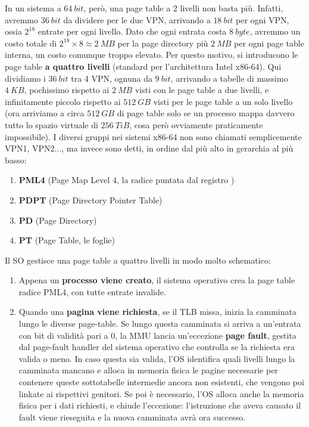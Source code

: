 \documentclass[11pt, a4paper, titlepage, oneside]{scrbook}
\begin{document}
In un sistema a $\SI{64}{bit}$, però, una page table a 2 livelli non basta più. Infatti, avremmo $\SI{36}{bit}$ da dividere per le due VPN, arrivando a $\SI{18}{bit}$ per ogni VPN, ossia $2^{18}$ entrate per ogni livello. Dato che ogni entrata costa $\SI{8}{byte}$, avremmo un costo totale di $2^{18} \times 8 \approx \SI{2}{MB}$ per la page directory più $\SI{2}{MB}$ per ogni page table interna, un costo comunque troppo elevato. Per questo motivo, si introducono le page table \textbf{a quattro livelli} (standard per l'architettura Intel x86-64). Qui dividiamo i $\SI{36}{bit}$ tra 4 VPN, ognuna da $\SI{9}{bit}$, arrivando a tabelle di massimo $\SI{4}{KB}$, pochissimo rispetto ai $\SI{2}{MB}$ visti con le page table a due livelli, e infinitamente piccolo rispetto ai $\SI{512}{GB}$ visti per le page table a un solo livello (ora arriviamo a circa $\SI{512}{GB}$ di page table solo se un processo mappa davvero tutto lo spazio virtuale di $\SI{256}{TiB}$, cosa però ovviamente praticamente impossibile). I diversi gruppi nei sistemi x86-64 non sono chiamati semplicemente VPN1, VPN2..., ma invece sono detti, in ordine dal più alto in gerarchia al più basso:
\begin{enumerate}[label=\arabic*°]
    \item \textbf{PML4} (Page Map Level 4, la radice puntata dal registro )
    \item \textbf{PDPT} (Page Directory Pointer Table)
    \item \textbf{PD} (Page Directory)
    \item \textbf{PT} (Page Table, le foglie)
\end{enumerate}

Il SO gestisce una page table a quattro livelli in modo molto schematico:
\begin{enumerate}[label=\arabic*°]
    \item Appena un \textbf{processo viene creato}, il sistema operativo crea la page table radice PML4, con tutte entrate invalide.
    \item Quando una \textbf{pagina viene richiesta}, se il TLB missa, inizia la camminata lungo le diverse page-table. Se lungo questa camminata si arriva a un'entrata con bit di validità pari a 0, la MMU lancia un'eccezione \textbf{page fault}, gestita dal page-fault handler del sistema operativo che controlla se la richiesta era valida o meno. In caso questa sia valida, l'OS identifica quali livelli lungo la camminata mancano e alloca in memoria fisica le pagine necessarie per contenere queste sottotabelle intermedie ancora non esistenti, che vengono poi linkate ai rispettivi genitori. Se poi è necessario, l'OS alloca anche la memoria fisica per i dati richiesti, e chiude l'eccezione: l'istruzione che aveva causato il fault viene rieseguita e la nuova camminata avrà ora successo.
\end{enumerate}
\end{document}
